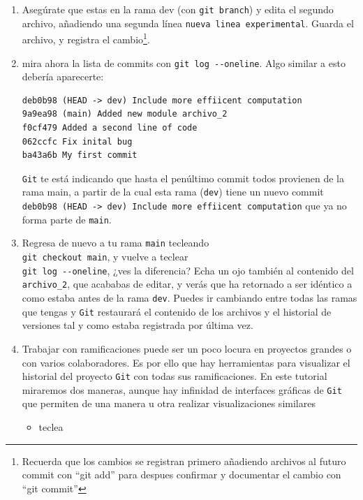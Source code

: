 \documentclass[a4paper,11pt]{report}
\newcommand{\cverb}{\Verb}
\begin{document}
\begin{enumerate}
    si tecleas \cverb+git log+ o \cverb+git log --oneline+ verás que tenemos los mismos commits que con tu rama maestra, y si echas un ojo al contenido de tus archivos aparecen exactamente como estaban en main. Es decir ambas ramas en este momento son exactamente idénticas.
    
    \item Asegúrate que estas en la rama dev (con \cverb+git branch+) y edita el segundo archivo, añadiendo una segunda línea \cverb+nueva linea experimental+. Guarda el archivo, y registra el cambio\footnote{Recuerda que los cambios se registran primero añadiendo archivos al futuro commit con ``git add'' para despues confirmar y documentar el cambio con ``git commit''}.
    
    \item mira ahora la lista de commits con \cverb+git log --oneline+. Algo similar a esto debería aparecerte:
    
    \begin{lstlisting}[style=custom]
deb0b98 (HEAD -> dev) Include more effiicent computation
9a9ea98 (main) Added new module archivo_2
f0cf479 Added a second line of code
062ccfc Fix inital bug
ba43a6b My first commit
    \end{lstlisting}

    \verb+Git+ te está indicando que hasta el penúltimo commit todos provienen de la rama main, a partir de la cual esta rama (\verb+dev+) tiene un nuevo commit\\
    \verb+deb0b98 (HEAD -> dev) Include more effiicent computation+ que ya no forma parte de \verb+main+.
    
    \item Regresa de nuevo a tu rama \verb+main+ tecleando \\
    \cverb+git checkout main+, y vuelve a teclear\\
    \cverb+git log --oneline+, ¿ves la diferencia? Echa un ojo también al contenido del \verb+archivo_2+, que acababas de editar, y verás que ha retornado a ser idéntico a como estaba antes de la rama \verb+dev+. Puedes ir cambiando entre todas las ramas que tengas y \verb+Git+ restaurará el contenido de los archivos y el historial de versiones tal y como estaba registrada por última vez.
    
    \item Trabajar con ramificaciones puede ser un poco locura en proyectos grandes o con varios colaboradores. Es por ello que hay herramientas para visualizar el historial del proyecto \verb+Git+ con todas sus ramificaciones. En este tutorial miraremos dos maneras, aunque hay infinidad de interfaces gráficas de \verb+Git+ que permiten de una manera u otra realizar visualizaciones similares
    \begin{itemize}
     \item teclea
          

\end{itemize}
\end{enumerate}
\end{document}
